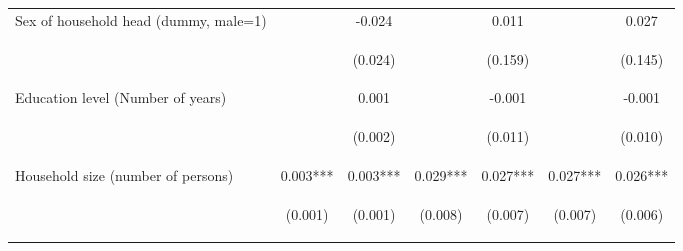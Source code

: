 \begin{center}
\begin{tabular}{lcccccc}
Sex of household head (dummy, male=1) &  & -0.024 &  & 0.011 &  & 0.027 \\
\vspace{4pt} & \begin{footnotesize}\end{footnotesize} & \begin{footnotesize}(0.024)\end{footnotesize} & \begin{footnotesize}\end{footnotesize} & \begin{footnotesize}(0.159)\end{footnotesize} & \begin{footnotesize}\end{footnotesize} & \begin{footnotesize}(0.145)\end{footnotesize} \\
Education level (Number of years) &  & 0.001 &  & -0.001 &  & -0.001 \\
\vspace{4pt} & \begin{footnotesize}\end{footnotesize} & \begin{footnotesize}(0.002)\end{footnotesize} & \begin{footnotesize}\end{footnotesize} & \begin{footnotesize}(0.011)\end{footnotesize} & \begin{footnotesize}\end{footnotesize} & \begin{footnotesize}(0.010)\end{footnotesize} \\
Household size (number of persons) & 0.003*** & 0.003*** & 0.029*** & 0.027*** & 0.027*** & 0.026*** \\
\vspace{4pt} & \begin{footnotesize}(0.001)\end{footnotesize} & \begin{footnotesize}(0.001)\end{footnotesize} & \begin{footnotesize}(0.008)\end{footnotesize} & \begin{footnotesize}(0.007)\end{footnotesize} & \begin{footnotesize}(0.007)\end{footnotesize} & \begin{footnotesize}(0.006)\end{footnotesize} \\

\end{tabular}
\end{center}
